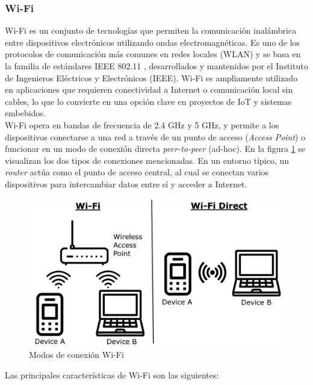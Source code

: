 \subsubsection{Wi-Fi}

Wi-Fi es un conjunto de tecnologías que permiten la comunicación inalámbrica entre dispositivos electrónicos utilizando ondas electromagnéticas. Es uno de los protocolos de comunicación más comunes en redes locales (WLAN) y se basa en la familia de estándares IEEE 802.11 \cite{ieee_802.11}, desarrollados y mantenidos por el Instituto de Ingenieros Eléctricos y Electrónicos (IEEE). Wi-Fi es ampliamente utilizado en aplicaciones que requieren conectividad a Internet o comunicación local sin cables, lo que lo convierte en una opción clave en proyectos de IoT y sistemas embebidos. \\


Wi-Fi opera en bandas de frecuencia de 2.4 GHz y 5 GHz, y permite a los dispositivos conectarse a una red a través de un punto de acceso (\textit{Access Point}) o funcionar en un modo de conexión directa \textit{peer-to-peer} (ad-hoc). En la figura \ref{fig:wifi} se visualizan los dos tipos de conexiones mencionadas. En un entorno típico, un \textit{router} actúa como el punto de acceso central, al cual se conectan varios dispositivos para intercambiar datos entre sí y acceder a Internet. \\ 

\begin{figure}[H]
    \centering
    \includegraphics[width = 0.7 \linewidth]{img/wifi.png}
    \caption{Modos de conexión Wi-Fi \cite{wifi_img}}
    \label{fig:wifi}
\end{figure}


Las principales características de Wi-Fi son las siguientes:

